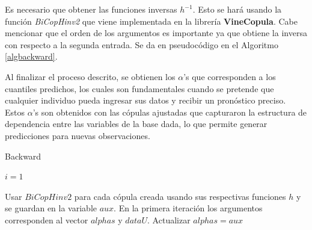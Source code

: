 Es necesario que obtener las funciones inversas $h^{-1}$. Esto se hará usando la función \textit{BiCopHinv2} que viene implementada en la librería \textbf{VineCopula}. Cabe mencionar que el orden de los argumentos es importante ya que obtiene la inversa con respecto a la segunda entrada. Se da en pseudocódigo en el Algoritmo \ref{algbackward}.

Al finalizar el proceso descrito, se obtienen los $\alpha$'s que corresponden a los cuantiles predichos, los cuales son fundamentales cuando se pretende que cualquier individuo pueda ingresar sus datos y recibir un pronóstico preciso. Estos $\alpha$'s son obtenidos con las cópulas ajustadas que capturaron la estructura de dependencia entre las variables de la base dada, lo que permite generar predicciones para nuevas observaciones. 

\begin{algorithm}[H]
      \caption{Backward}
      \label{algbackward}
      \begin{algorithmic}[1]  
        \State $i = 1$
        
          \State Usar $BiCopHinv2$ para cada cópula creada usando sus respectivas funciones $h$ y se guardan en la variable $aux$. En la primera iteración los argumentos corresponden al vector $alphas$ y $dataU$.
          \State Actualizar $alphas = aux$
        \EndWhile

      \end{algorithmic}
    \end{algorithm}

